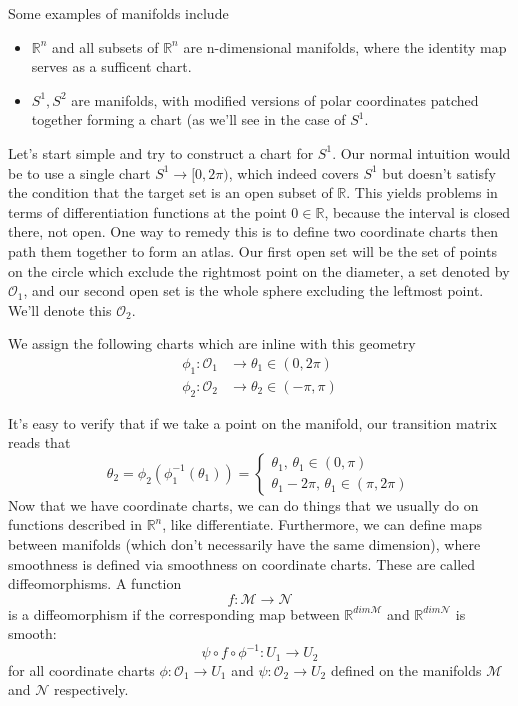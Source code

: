 Some examples of manifolds include 
\begin{itemize} 
\item $\mathbb{R}^n$ and all subsets of $\mathbb{R}^n$ are n-dimensional manifolds, where the identity map serves as a sufficent chart. 
\item $S^1, S^2$ are manifolds, with modified versions of polar coordinates patched together forming a chart (as we'll see in the case of $S^1$. 
\end{itemize}
Let's start simple and try to construct a chart for $S^1$. Our normal intuition would be to use a single chart $S^1 \rightarrow [0, 2 \pi) $, which indeed covers $S^1 $ but doesn't satisfy the condition that the target set is an open subset of $\mathbb{R}$. This yields problems in terms of differentiation functions at the point $0 \in \mathbb{R}$, because the interval is closed there, not open. One way to remedy this is to define two coordinate charts then path them together to form an atlas. Our first open set will be the set of points on the circle which exclude the rightmost point on the diameter, a set denoted by $\mathcal{O}_1$, and our second open set is the whole sphere excluding the leftmost point. We'll denote this $\mathcal{ O}_2 $. 

We assign the following charts which are inline with this geometry
\begin{align*} 
\phi_1 : \mathcal{O}_1 &\rightarrow \theta_1 \in (0, 2 \pi ) \\
\phi_2 : \mathcal{O}_2 &\rightarrow \theta_2 \in ( - \pi , \pi ) 
\end{align*} 

It's easy to verify that if we take a point on the manifold, our transition matrix reads that 
\[ 
\theta_2 = \phi_2 ( \phi_1^{ -1} ( \theta_1) )  = \begin{cases} 
\theta_1, \, \theta_1 \in (0 , \pi ) \\
\theta_1  - 2 \pi,  \, \theta_1 \in ( \pi, 2 \pi ) 
\end{cases} 
\] 
Now that we have coordinate charts, we can do things that we usually do on functions described in $\mathbb{ R}^n $, like differentiate. 
Furthermore, we can define maps between manifolds (which don't necessarily have the same dimension), where smoothness is defined via smoothness on coordinate charts. These are called diffeomorphisms. A function 
\[
f: \mathcal{ M} \rightarrow \mathcal{ N } 
\]
is a diffeomorphism if the corresponding map between $\mathbb{R}^{ dim \mathcal{M} } $ and $\mathbb{R}^{ dim \mathcal{N } } $ is smooth: 
\[ 
\psi \circ f \circ \phi^{ -1} : U_1 \rightarrow U_2 
\] for all coordinate charts $\phi : \mathcal{O}_1 \rightarrow U_1$ and $\psi: \mathcal{O}_2 \rightarrow U_2$ defined on the manifolds $\mathcal{M}$ and $\mathcal{N}$ respectively. 

